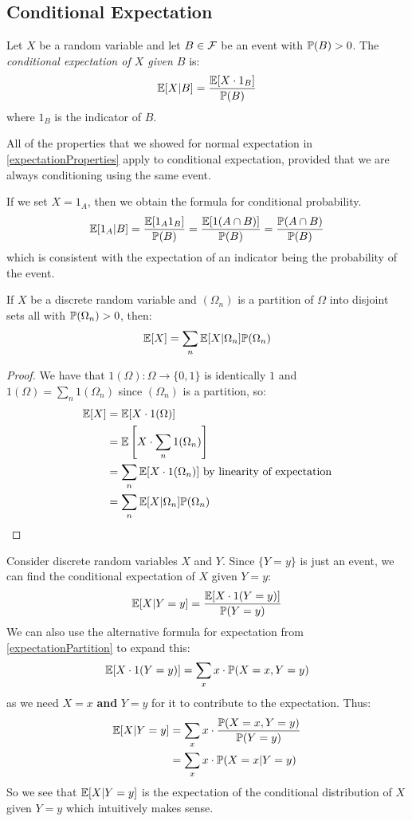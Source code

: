 \documentclass[../main.tex]{subfiles}
\begin{document}
\subsection{Conditional Expectation}
\begin{definition}
  Let $X$ be a random variable and let $B \in \salg$ be an event with $\P(B) > 0$.
  The \textit{conditional expectation of $X$ given $B$} is:
  \[
    \E[X \vert B] = \frac{\E[X \cdot 1_B]}{\P(B)}
  \]
  where $1_B$ is the indicator of $B$.
\end{definition}
\begin{remark}[Note]
  All of the properties that we showed for normal expectation in \cref{expectationProperties} apply to conditional expectation, provided that we are always conditioning using the same event.
\end{remark}
\begin{remark}
  If we set $X = 1_A$, then we obtain the formula for conditional probability.
  \[
    \E[1_A \vert B] = \frac{\E[1_A 1_B]}{\P(B)} = \frac{\E[1(A \cap B)]}{\P(B)} = \frac{\P(A \cap B)}{\P(B)}
  \]
  which is consistent with the expectation of an indicator being the probability of the event.
\end{remark}
\begin{proposition}
  If $X$ be a discrete random variable and $(\Omega_n)$ is a partition of $\Omega$ into disjoint sets all with $\P(\Omega_n) > 0$, then:
  \label{lawOfTotalExp}
  \[
    \E[X] = \sum_{n} \E[X \vert \Omega_n]\P(\Omega_n)
  \]
\end{proposition}
\begin{proof}
  We have that $1(\Omega): \Omega \to \{0, 1\}$ is identically $1$ and $1(\Omega) = \sum_{n} 1(\Omega_n)$ since $(\Omega_n)$ is a partition, so:
  \begin{align*}
    \E[X] &= \E[X \cdot 1(\Omega)] \\
          &= \E\left[X \cdot \sum_{n} 1(\Omega_n)\right] \\
          &= \sum_{n} \E[X \cdot 1(\Omega_n)] \text{ by linearity of expectation}\\
          &= \sum_{n} \E[X \vert \Omega_n]\P(\Omega_n)
  \end{align*}
\end{proof}
Consider discrete random variables $X$ and $Y$.
Since $\{Y = y\}$ is just an event, we can find the conditional expectation of $X$ given $Y = y$:
\[
  \E[X \vert Y = y] = \frac{\E[X \cdot 1(Y = y)]}{\P(Y = y)}
\]
We can also use the alternative formula for expectation from \cref{expectationPartition} to expand this:
\[
  \E[X \cdot 1(Y = y)] = \sum_{x} x \cdot \P(X = x, Y = y) \\
\]
as we need $X = x$ \textbf{and} $Y = y$ for it to contribute to the expectation.
Thus:
\begin{align}
  \E[X \vert Y = y] &= \sum_{x} x \cdot \frac{\P(X = x, Y = y)}{\P(Y = y)} \nonumber \\
                    &= \sum_{x} x \cdot \P(X = x \vert Y = y) \label{conditionalExpectationSum}
\end{align}
So we see that $\E[X \vert Y = y]$ is the expectation of the conditional distribution of $X$ given $Y = y$ which intuitively makes sense.
\end{document}
